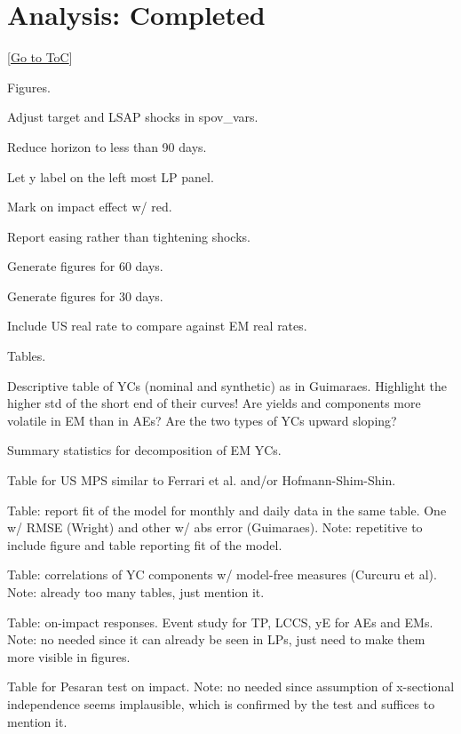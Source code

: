 \documentclass[12pt]{article}
\newcommand{\gototoc}{\vspace{-1.8cm} \null\hfill [\hyperlink{toc}{Go to ToC}] \newline}
\newcommand{\cmark}{\ding{51}}
\newcommand{\xmark}{\ding{55}}
\newcommand{\done}{\rlap{$\square$}{\raisebox{2pt}{\large\hspace{1pt}\cmark}}%
	\hspace{-2.5pt}}
\newcommand{\wontdo}{\rlap{$\square$}{\large\hspace{1pt}\xmark}}
\begin{document}
\section{Analysis: Completed}
\gototoc
	\begin{todolist}
	\item[\done] Figures.
	\begin{todolist}
		\item[\done] Adjust target and LSAP shocks in spov_vars.
		\item[\done] Reduce horizon to less than 90 days.
		\item[\done] Let y label on the left most LP panel.
		\item[\done] Mark on impact effect w/ red.
		\item[\done] Report easing rather than tightening shocks.
		\item[\done] Generate figures for 60 days.
		\item[\done] Generate figures for 30 days.
		\item[\done] Include US real rate to compare against EM real rates.
	\end{todolist}
	\item[\done] Tables.
	\begin{todolist}
		\item[\done] Descriptive table of YCs (nominal and synthetic) as in Guimaraes. Highlight the higher std of the short end of their curves! Are yields and components more volatile in EM than in AEs? Are the two types of YCs upward sloping?
		\item[\done] Summary statistics for decomposition of EM YCs.
		\item[\done] Table for US MPS similar to Ferrari et al. and/or Hofmann-Shim-Shin.
		\item[\wontdo] Table: report fit of the model for monthly and daily data in the same table. One w/ RMSE (Wright) and other w/ abs error (Guimaraes). Note: repetitive to include figure and table reporting fit of the model.
		\item[\wontdo] Table: correlations of YC components w/ model-free measures (Curcuru et al). Note: already too many tables, just mention it.
		\item[\wontdo] Table: on-impact responses. Event study for TP, LCCS, yE for AEs and EMs. Note: no needed since it can already be seen in LPs, just need to make them more visible in figures.
		\item[\wontdo] Table for Pesaran test on impact. Note: no needed since assumption of x-sectional independence seems implausible, which is confirmed by the test and suffices to mention it.

\end{todolist}
\end{todolist}
\end{document}
